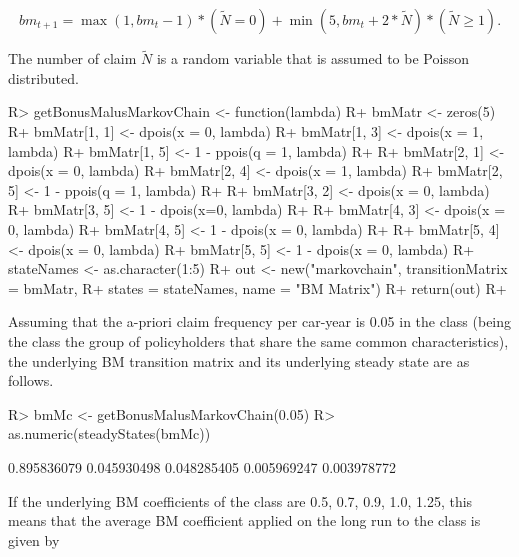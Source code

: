 \documentclass[article,nojss]{jss}
\begin{document}
\begin{equation}
bm_{t + 1} = \max \left( {1,bm_{t} - 1} \right)*\left( {\tilde N = 0} \right) + \min \left( {5,bm_{t} + 2*\tilde N} \right)*\left( {\tilde N \ge 1} \right).
\label{eq:BM}
\end{equation}

The number of claim \(\tilde N\) is a random variable that is assumed
to be Poisson distributed.

\begin{CodeChunk}

\begin{CodeInput}
R> getBonusMalusMarkovChain <- function(lambda) {
R+  bmMatr <- zeros(5)
R+  bmMatr[1, 1] <- dpois(x = 0, lambda)
R+  bmMatr[1, 3] <- dpois(x = 1, lambda)
R+  bmMatr[1, 5] <- 1 - ppois(q = 1, lambda)
R+  
R+  bmMatr[2, 1] <- dpois(x = 0, lambda)
R+  bmMatr[2, 4] <- dpois(x = 1, lambda)
R+  bmMatr[2, 5] <- 1 - ppois(q = 1, lambda)
R+  
R+  bmMatr[3, 2] <- dpois(x = 0, lambda)
R+  bmMatr[3, 5] <- 1 - dpois(x=0, lambda)
R+  
R+  bmMatr[4, 3] <- dpois(x = 0, lambda)
R+  bmMatr[4, 5] <- 1 - dpois(x = 0, lambda)
R+   
R+  bmMatr[5, 4] <- dpois(x = 0, lambda)
R+  bmMatr[5, 5] <- 1 - dpois(x = 0, lambda)
R+  stateNames <- as.character(1:5)
R+  out <- new("markovchain", transitionMatrix = bmMatr, 
R+              states = stateNames, name = "BM Matrix")
R+  return(out)
R+ }
\end{CodeInput}
\end{CodeChunk}

Assuming that the a-priori claim frequency per car-year is 0.05 in the class (being the class the group of policyholders that share the same common characteristics), the underlying BM transition matrix and its underlying steady state are as follows.

\begin{CodeChunk}

\begin{CodeInput}
R> bmMc <- getBonusMalusMarkovChain(0.05)
R> as.numeric(steadyStates(bmMc))
\end{CodeInput}

\begin{CodeOutput}
[1] 0.895836079 0.045930498 0.048285405 0.005969247 0.003978772
\end{CodeOutput}
\end{CodeChunk}

If the underlying BM coefficients of the class are 0.5, 0.7, 0.9, 1.0, 1.25, this means that the average BM coefficient applied on the long run to the class is given by
\end{document}
